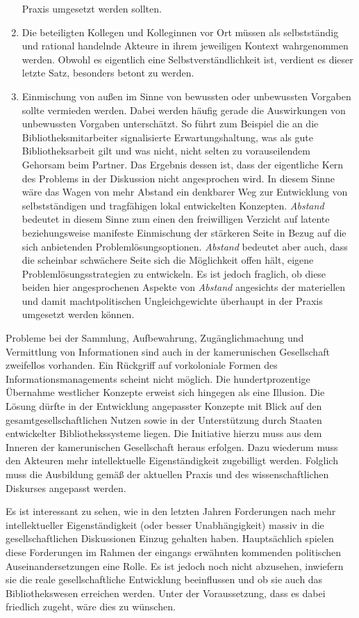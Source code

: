 \documentclass[a4paper,
fontsize=11pt,
oneside,
numbers=noperiodatend,
parskip=half-,
bibliography=totoc,
final
]{scrartcl}
\begin{document}
\begin{enumerate}
  Praxis umgesetzt werden sollten.
\item
  Die beteiligten Kollegen und Kolleginnen vor Ort müssen als
  selbstständig und rational handelnde Akteure in ihrem jeweiligen
  Kontext wahrgenommen werden. Obwohl es eigentlich eine
  Selbstverständlichkeit ist, verdient es dieser letzte Satz, besonders
  betont zu werden.
\item
  Einmischung von außen im Sinne von bewussten oder unbewussten Vorgaben
  sollte vermieden werden. Dabei werden häufig gerade die Auswirkungen
  von unbewussten Vorgaben unterschätzt. So führt zum Beispiel die an
  die Bibliotheksmitarbeiter signalisierte Erwartungshaltung, was als
  gute Bibliotheksarbeit gilt und was nicht, nicht selten zu
  vorauseilendem Gehorsam beim Partner. Das Ergebnis dessen ist, dass
  der eigentliche Kern des Problems in der Diskussion nicht angesprochen
  wird. In diesem Sinne wäre das Wagen von mehr Abstand ein denkbarer
  Weg zur Entwicklung von selbstständigen und tragfähigen lokal
  entwickelten Konzepten. \emph{Abstand} bedeutet in diesem Sinne zum
  einen den freiwilligen Verzicht auf latente beziehungsweise manifeste
  Einmischung der stärkeren Seite in Bezug auf die sich anbietenden
  Problemlösungsoptionen. \emph{Abstand} bedeutet aber auch, dass die
  scheinbar schwächere Seite sich die Möglichkeit offen hält, eigene
  Problemlösungsstrategien zu entwickeln. Es ist jedoch fraglich, ob
  diese beiden hier angesprochenen Aspekte von \emph{Abstand} angesichts
  der materiellen und damit machtpolitischen Ungleichgewichte überhaupt
  in der Praxis umgesetzt werden können.
\end{enumerate}

Probleme bei der Sammlung, Aufbewahrung, Zugänglichmachung und
Vermittlung von Informationen sind auch in der kamerunischen
Gesellschaft zweifellos vorhanden. Ein Rückgriff auf vorkoloniale Formen
des Informationsmanagements scheint nicht möglich. Die hundertprozentige
Übernahme westlicher Konzepte erweist sich hingegen als eine Illusion.
Die Lösung dürfte in der Entwicklung angepasster Konzepte mit Blick auf
den gesamtgesellschaftlichen Nutzen sowie in der Unterstützung durch
Staaten entwickelter Bibliothekssysteme liegen. Die Initiative hierzu
muss aus dem Inneren der kamerunischen Gesellschaft heraus erfolgen.
Dazu wiederum muss den Akteuren mehr intellektuelle Eigenständigkeit
zugebilligt werden. Folglich muss die Ausbildung gemäß der aktuellen
Praxis und des wissenschaftlichen Diskurses angepasst werden.

Es ist interessant zu sehen, wie in den letzten Jahren Forderungen nach
mehr intellektueller Eigenständigkeit (oder besser Unabhängigkeit)
massiv in die gesellschaftlichen Diskussionen Einzug gehalten haben.
Hauptsächlich spielen diese Forderungen im Rahmen der eingangs erwähnten
kommenden politischen Auseinandersetzungen eine Rolle. Es ist jedoch
noch nicht abzusehen, inwiefern sie die reale gesellschaftliche
Entwicklung beeinflussen und ob sie auch das Bibliothekswesen erreichen
werden. Unter der Voraussetzung, dass es dabei friedlich zugeht, wäre
dies zu wünschen.
\end{document}
